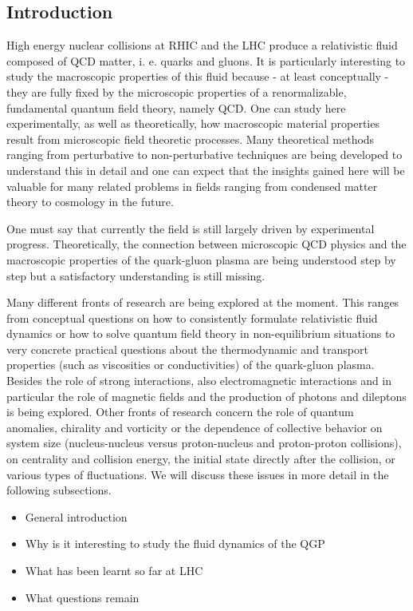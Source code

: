 \subsection{Introduction}

High energy nuclear collisions at RHIC and the LHC produce a relativistic fluid composed of QCD matter, i. e. quarks and gluons. It is particularly interesting to study the macroscopic properties of this fluid because - at least conceptually - they are fully fixed by the microscopic properties of a renormalizable, fundamental quantum field theory, namely QCD. One can study here experimentally, as well as theoretically, how macroscopic material properties result from microscopic field theoretic processes. Many theoretical methods ranging from perturbative to non-perturbative techniques are being developed to understand this in detail and one can expect that the insights gained here will be valuable for many related problems in fields ranging from condensed matter theory to cosmology in the future.  

One must say that currently the field is still largely driven by experimental progress. Theoretically, the connection between microscopic QCD physics and the macroscopic properties of the quark-gluon plasma are being understood step by step but a satisfactory understanding is still missing. 

Many different fronts of research are being explored at the moment. This ranges from conceptual questions on how to consistently formulate relativistic fluid dynamics or how to solve quantum field theory in non-equilibrium situations to very concrete practical questions about the thermodynamic and transport properties (such as viscosities or conductivities) of the quark-gluon plasma. Besides the role of strong interactions, also electromagnetic interactions and in particular the role of magnetic fields and the production of photons and dileptons is being explored. Other fronts of research concern the role of quantum anomalies, chirality and vorticity or the dependence of collective behavior on system size (nucleus-nucleus versus proton-nucleus and proton-proton collisions), on centrality and collision energy, the initial state directly after the collision, or various types of fluctuations. We will discuss these issues in more detail in the following subsections.


\begin{itemize}
	\item General introduction
	\item Why is it interesting to study the fluid dynamics of the QGP
	\item What has been learnt so far at LHC 
	\item What questions remain
\end{itemize}
